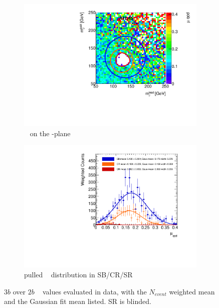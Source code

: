 \begin{figure}[htbp!]
\centering
\captionsetup{justification=centering}
	\hspace{-1cm}
    \begin{subfigure}[b]{0.4\textwidth}
        \includegraphics[width=\textwidth,angle=-90]{figures/boosted/AppendixMuqcdstudy/ThreeTag_Incl_mH0H1.pdf}
        \caption{\muqcd~ on the \mleadJ-\msublJ plane}
        \label{fig:app-muqcd-3b-2d}
    \end{subfigure}
    \quad \quad \quad \quad 
    \begin{subfigure}[b]{0.4\textwidth}
        \includegraphics[width=\textwidth,angle=-90]{figures/boosted/AppendixMuqcdstudy/ThreeTag_Incl_mH0H1_pull.pdf}
        \caption{pulled \muqcd~ distribution in SB/CR/SR}
        \label{fig:app-muqcd-3b-pull}
    \end{subfigure}
\caption{$3b$ over $2b$ \muqcd~ values evaluated in data, with the $N_{event}$ weighted mean and the Gaussian fit mean listed. SR is blinded.}
\label{fig:app-muqcd-3b}
\end{figure}

